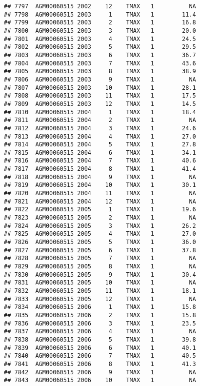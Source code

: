 \documentclass{article}\usepackage[]{graphicx}\usepackage[]{color}
\makeatletter
\newenvironment{kframe}{%
 \def\at@end@of@kframe{}%
 \ifinner\ifhmode%
  \def\at@end@of@kframe{\end{minipage}}%
  \begin{minipage}{\columnwidth}%
 \fi\fi%
 \def\FrameCommand##1{\hskip\@totalleftmargin \hskip-\fboxsep
 \colorbox{shadecolor}{##1}\hskip-\fboxsep
     \hskip-\linewidth \hskip-\@totalleftmargin \hskip\columnwidth}%
 \MakeFramed {\advance\hsize-\width
   \@totalleftmargin\z@ \linewidth\hsize
   \@setminipage}}%
 {\par\unskip\endMakeFramed%
 \at@end@of@kframe}
\newenvironment{knitrout}{}{} %
\makeatother
\begin{document}
\begin{knitrout}
\begin{kframe}
\begin{verbatim}
## 7797  AGM00060515 2002    12    TMAX   1          NA
## 7798  AGM00060515 2003     1    TMAX   1        11.4
## 7799  AGM00060515 2003     2    TMAX   1        16.8
## 7800  AGM00060515 2003     3    TMAX   1        20.0
## 7801  AGM00060515 2003     4    TMAX   1        24.5
## 7802  AGM00060515 2003     5    TMAX   1        29.5
## 7803  AGM00060515 2003     6    TMAX   1        36.7
## 7804  AGM00060515 2003     7    TMAX   1        43.6
## 7805  AGM00060515 2003     8    TMAX   1        38.9
## 7806  AGM00060515 2003     9    TMAX   1          NA
## 7807  AGM00060515 2003    10    TMAX   1        28.1
## 7808  AGM00060515 2003    11    TMAX   1        17.5
## 7809  AGM00060515 2003    12    TMAX   1        14.5
## 7810  AGM00060515 2004     1    TMAX   1        18.4
## 7811  AGM00060515 2004     2    TMAX   1          NA
## 7812  AGM00060515 2004     3    TMAX   1        24.6
## 7813  AGM00060515 2004     4    TMAX   1        27.0
## 7814  AGM00060515 2004     5    TMAX   1        27.8
## 7815  AGM00060515 2004     6    TMAX   1        34.1
## 7816  AGM00060515 2004     7    TMAX   1        40.6
## 7817  AGM00060515 2004     8    TMAX   1        41.4
## 7818  AGM00060515 2004     9    TMAX   1          NA
## 7819  AGM00060515 2004    10    TMAX   1        30.1
## 7820  AGM00060515 2004    11    TMAX   1          NA
## 7821  AGM00060515 2004    12    TMAX   1          NA
## 7822  AGM00060515 2005     1    TMAX   1        19.6
## 7823  AGM00060515 2005     2    TMAX   1          NA
## 7824  AGM00060515 2005     3    TMAX   1        26.2
## 7825  AGM00060515 2005     4    TMAX   1        27.0
## 7826  AGM00060515 2005     5    TMAX   1        36.0
## 7827  AGM00060515 2005     6    TMAX   1        37.8
## 7828  AGM00060515 2005     7    TMAX   1          NA
## 7829  AGM00060515 2005     8    TMAX   1          NA
## 7830  AGM00060515 2005     9    TMAX   1        30.4
## 7831  AGM00060515 2005    10    TMAX   1          NA
## 7832  AGM00060515 2005    11    TMAX   1        18.1
## 7833  AGM00060515 2005    12    TMAX   1          NA
## 7834  AGM00060515 2006     1    TMAX   1        15.8
## 7835  AGM00060515 2006     2    TMAX   1        15.8
## 7836  AGM00060515 2006     3    TMAX   1        23.5
## 7837  AGM00060515 2006     4    TMAX   1          NA
## 7838  AGM00060515 2006     5    TMAX   1        39.8
## 7839  AGM00060515 2006     6    TMAX   1        40.1
## 7840  AGM00060515 2006     7    TMAX   1        40.5
## 7841  AGM00060515 2006     8    TMAX   1        41.3
## 7842  AGM00060515 2006     9    TMAX   1          NA
## 7843  AGM00060515 2006    10    TMAX   1          NA

\end{verbatim}
\end{kframe}
\end{knitrout}
\end{document}
